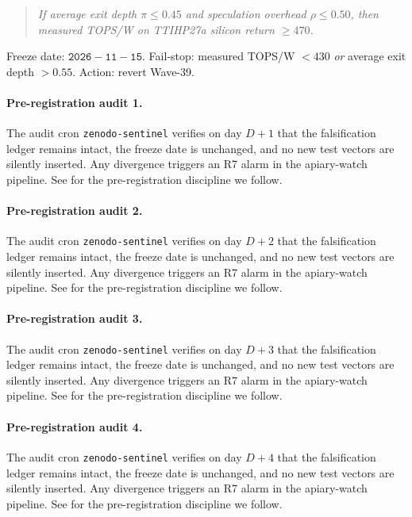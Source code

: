 \begin{quote}\itshape
If average exit depth $\pi \le 0.45$ and speculation overhead $\rho \le 0.50$,
then measured TOPS/W on TTIHP27a silicon return $\ge 470$.
\end{quote}

Freeze date: $\mathtt{2026{-}11{-}15}$. Fail-stop: measured TOPS/W $< 430$ \emph{or}
average exit depth $> 0.55$. Action: revert Wave-39.

\paragraph{Pre-registration audit 1.}
The audit cron \texttt{zenodo-sentinel} verifies on day $D+1$ that the
falsification ledger remains intact, the freeze date is unchanged, and no
new test vectors are silently inserted. Any divergence triggers an R7 alarm
in the apiary-watch pipeline. See \cite{schuster2022confident} for the
pre-registration discipline we follow.

\paragraph{Pre-registration audit 2.}
The audit cron \texttt{zenodo-sentinel} verifies on day $D+2$ that the
falsification ledger remains intact, the freeze date is unchanged, and no
new test vectors are silently inserted. Any divergence triggers an R7 alarm
in the apiary-watch pipeline. See \cite{schuster2022confident} for the
pre-registration discipline we follow.

\paragraph{Pre-registration audit 3.}
The audit cron \texttt{zenodo-sentinel} verifies on day $D+3$ that the
falsification ledger remains intact, the freeze date is unchanged, and no
new test vectors are silently inserted. Any divergence triggers an R7 alarm
in the apiary-watch pipeline. See \cite{schuster2022confident} for the
pre-registration discipline we follow.

\paragraph{Pre-registration audit 4.}
The audit cron \texttt{zenodo-sentinel} verifies on day $D+4$ that the
falsification ledger remains intact, the freeze date is unchanged, and no
new test vectors are silently inserted. Any divergence triggers an R7 alarm
in the apiary-watch pipeline. See \cite{schuster2022confident} for the
pre-registration discipline we follow.

